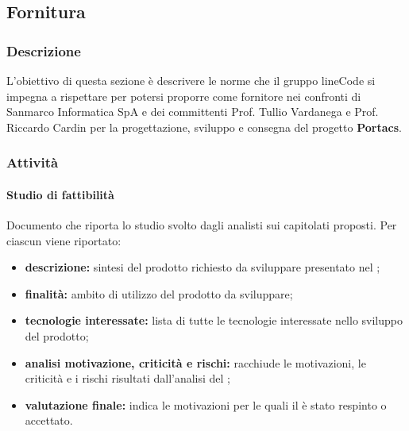 \subsection{Fornitura}

	\subsubsection{Descrizione}
	L'obiettivo di questa sezione è descrivere le norme che il gruppo lineCode si impegna a rispettare per potersi proporre come fornitore nei confronti di Sanmarco Informatica SpA e dei committenti Prof. Tullio Vardanega e Prof. Riccardo Cardin per la progettazione, sviluppo e consegna del progetto \textbf{Portacs}.

	\subsubsection{Attività}
		\paragraph{Studio di fattibilità}
		Documento che riporta lo studio svolto dagli analisti sui capitolati proposti. Per ciascun  viene riportato:
		\begin{itemize}
			\item \textbf{descrizione:} sintesi del prodotto richiesto da sviluppare presentato nel ;
		 	\item \textbf{finalità:} ambito di utilizzo del prodotto da sviluppare;
		 	\item \textbf{tecnologie interessate:} lista di tutte le tecnologie interessate nello sviluppo del prodotto;
		 	\item \textbf{analisi motivazione, criticità e rischi:} racchiude le motivazioni, le criticità e i rischi risultati dall'analisi del ;
		 	\item \textbf{valutazione finale:} indica le motivazioni per le quali il  è stato respinto o accettato.
		\end{itemize}

